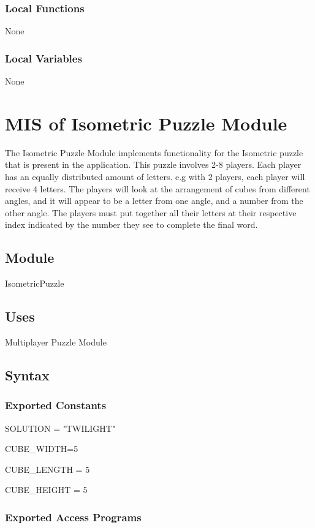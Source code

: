 \documentclass[12pt, titlepage]{article}
\begin{document}
\subsubsection{Local Functions}
None
\subsubsection{Local Variables}
None
\newpage

\section{MIS of Isometric Puzzle Module} \label{sec:Code}
\noindent The Isometric Puzzle Module implements functionality for the Isometric puzzle that is present in the application. This puzzle involves 2-8 players. Each player has an equally distributed amount of letters. e.g with 2 players, each player will receive 4 letters. The players will look at the arrangement of cubes from different angles, and it will appear to be a letter from one angle, and a number from the other angle. The players must put together all their letters at their respective index indicated by the number they see to complete the final word.

\subsection{Module}
IsometricPuzzle

\subsection{Uses}
Multiplayer Puzzle Module

\subsection{Syntax}

\subsubsection{Exported Constants}
SOLUTION = "TWILIGHT"

\noindent CUBE\_WIDTH=5

\noindent CUBE\_LENGTH = 5

\noindent CUBE\_HEIGHT = 5

\subsubsection{Exported Access Programs}
\end{document}
